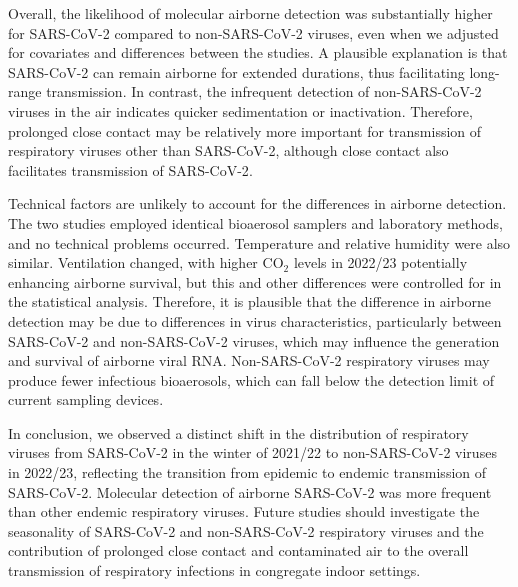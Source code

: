 \documentclass[fleqn,11pt]{wlscirep}
\begin{document}
Overall, the likelihood of molecular airborne detection was substantially higher for SARS-CoV-2 compared to non-SARS-CoV-2 viruses, even when we adjusted for covariates and differences between the studies. A plausible explanation is that SARS-CoV-2 can remain airborne for extended durations, thus facilitating long-range transmission. In contrast, the infrequent detection of non-SARS-CoV-2 viruses in the air indicates quicker sedimentation or inactivation. Therefore, prolonged close contact may be relatively more important for transmission of respiratory viruses other than SARS-CoV-2, although close contact also facilitates transmission of SARS-CoV-2\cite{Leung2020NatMed,Lind2023NatCommun}.

Technical factors are unlikely to account for the differences in airborne detection. The two studies employed identical bioaerosol samplers and laboratory methods, and no technical problems occurred. Temperature and relative humidity were also similar. Ventilation changed, with higher CO$_2$ levels in 2022/23 potentially enhancing airborne survival, but this and other differences were controlled for in the statistical analysis. Therefore, it is plausible that the difference in airborne detection may be due to differences in virus characteristics, particularly between SARS-CoV-2 and non-SARS-CoV-2 viruses, which may influence the generation and survival of airborne viral RNA\cite{Wang2021}. Non-SARS-CoV-2 respiratory viruses may produce fewer infectious bioaerosols, which can fall below the detection limit of current sampling devices\cite{Belser2023PLOSPath}. 

In conclusion, we observed a distinct shift in the distribution of respiratory viruses from SARS-CoV-2 in the winter of 2021/22 to non-SARS-CoV-2 viruses in 2022/23, reflecting the transition from epidemic to endemic transmission of SARS-CoV-2. Molecular detection of airborne SARS-CoV-2 was more frequent than other endemic respiratory viruses. Future studies should investigate the seasonality of SARS-CoV-2 and non-SARS-CoV-2 respiratory viruses and the contribution of prolonged close contact and contaminated air to the overall transmission of respiratory infections in congregate indoor settings.   



\end{document}
